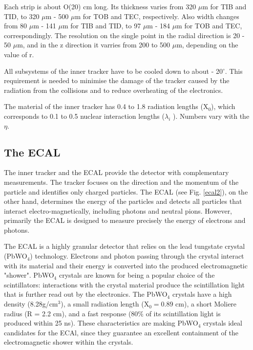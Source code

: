 \begin{normalsize}
Each strip is about O(20) cm long. Its thickness varies from 320 $\mu$m  for TIB and TID, to 320 $\mu$m - 500 $\mu$m  for TOB and TEC, respectively. Also width changes from 80 $\mu$m - 141 $\mu$m for TIB and TID, to 97 $\mu$m - 184 $\mu$m  for TOB and TEC, correspondingly. The resolution on the single point in the radial direction is 20 - 50 $\mu$m, and in the z direction it varries from 200 to 500 $\mu$m, depending on the value of r. 

All subsystems of the inner tracker have to be cooled down to about - 20$^{\circ}$.  This requirement is needed to minimise the damage of the tracker caused by the radiation from the collisions and to reduce overheating of the electronics. 

The material of the inner tracker has 0.4 to 1.8 radiation lengths (X$_0$), which corresponds to 0.1 to 0.5 nuclear interaction lengths ($\lambda_i $ ). Numbers vary with the $\eta$.





\subsection{The ECAL}


The inner tracker and the ECAL provide the detector with complementary measurements. The tracker focuses on the direction and the momentum of the particle and identifies only charged particles. The ECAL  \cite{ECAL_attendum} (see Fig. \ref{ecal2}), on the other hand, determines the energy of the particles and detects all particles that interact electro-magnetically, including photons and neutral pions. However, primarily the ECAL is designed to measure precisely the energy of electrons and photons. 

The ECAL is a highly granular detector that relies on the lead tungstate crystal (PbWO$_4$) technology. Electrons and photon passing through the crystal interact with its material and their energy is converted into the produced electromagnetic "shower". PbWO$_4$ crystals are known for being a popular choice of the scintillators: interactions with the crystal material produce the scintillation light that is further read out by the electronics. The PbWO$_4$ crystals have a high density (8.28g/cm$^3$), a small radiation length (X$_0 = 0.89$ cm), a short Moliere radius (R = 2.2 cm), and a fast response (80$\%$ of its scintillation light is produced within 25 ns). These characteristics are making PbWO$_4$ crystals ideal candidates for the ECAl, since they guarantee an excellent containment of the electromagnetic shower within the crystals. 


\end{normalsize}
